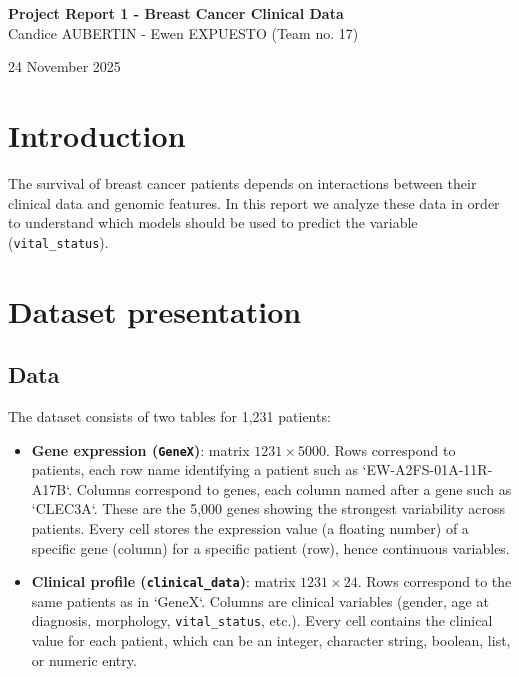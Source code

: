 \documentclass[12pt,a4paper]{report}
\begin{document}
\makeatletter
\def\maketitle{
  \begin{flushleft}
    {\LARGE \textbf{Project Report 1 - Breast Cancer Clinical Data}}\\[4pt]
    {\large Candice AUBERTIN - Ewen EXPUESTO (Team no. 17)}%
  \end{flushleft}
  \begin{flushright}
    \large 24 November 2025
  \end{flushright}
  \vspace{1cm}
}
\makeatother

\maketitle

\vspace{-2cm}

\section{Introduction}
The survival of breast cancer patients depends on interactions between their clinical data and genomic features. In this report we analyze these data in order to understand which models should be used to predict the variable (\texttt{vital\_status}).

\section{Dataset presentation}
\subsection{Data}
The dataset consists of two tables for 1,231 patients:
\begin{itemize}
  \item \textbf{Gene expression (\texttt{GeneX})}: matrix $1231 \times 5000$. Rows correspond to patients, each row name identifying a patient such as `EW-A2FS-01A-11R-A17B`. Columns correspond to genes, each column named after a gene such as `CLEC3A`. These are the 5,000 genes showing the strongest variability across patients. Every cell stores the expression value (a floating number) of a specific gene (column) for a specific patient (row), hence continuous variables.
  \item \textbf{Clinical profile (\texttt{clinical\_data})}: matrix $1231 \times 24$. Rows correspond to the same patients as in `GeneX`. Columns are clinical variables (gender, age at diagnosis, morphology, \texttt{vital\_status}, etc.). Every cell contains the clinical value for each patient, which can be an integer, character string, boolean, list, or numeric entry.
\end{itemize}
\end{document}
